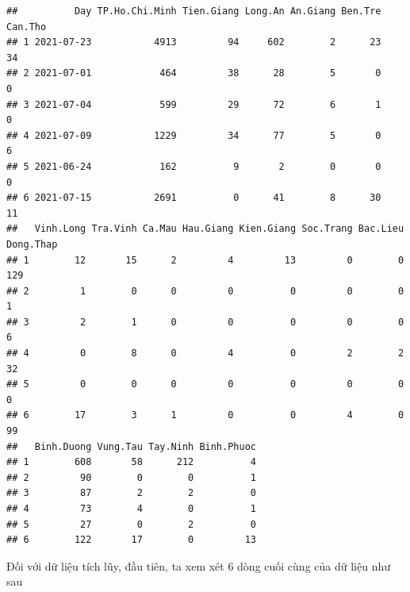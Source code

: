\documentclass[../thesis.tex]{subfiles}
\begin{document}
\begin{verbatim}
##          Day TP.Ho.Chi.Minh Tien.Giang Long.An An.Giang Ben.Tre Can.Tho
## 1 2021-07-23           4913         94     602        2      23      34
## 2 2021-07-01            464         38      28        5       0       0
## 3 2021-07-04            599         29      72        6       1       0
## 4 2021-07-09           1229         34      77        5       0       6
## 5 2021-06-24            162          9       2        0       0       0
## 6 2021-07-15           2691          0      41        8      30      11
##   Vinh.Long Tra.Vinh Ca.Mau Hau.Giang Kien.Giang Soc.Trang Bac.Lieu Dong.Thap
## 1        12       15      2         4         13         0        0       129
## 2         1        0      0         0          0         0        0         1
## 3         2        1      0         0          0         0        0         6
## 4         0        8      0         4          0         2        2        32
## 5         0        0      0         0          0         0        0         0
## 6        17        3      1         0          0         4        0        99
##   Binh.Duong Vung.Tau Tay.Ninh Binh.Phuoc
## 1        608       58      212          4
## 2         90        0        0          1
## 3         87        2        2          0
## 4         73        4        0          1
## 5         27        0        2          0
## 6        122       17        0         13
\end{verbatim}




\newpage

Đối với dữ liệu tích lũy, đầu tiên, ta xem xét 6 dòng cuối cùng của dữ liệu như sau

\begin{Shaded}
	\begin{Highlighting}[]
\SpecialCharTok{\%\textgreater{}\%} \NormalTok{()}
	\end{Highlighting}
\end{Shaded}
\end{document}
